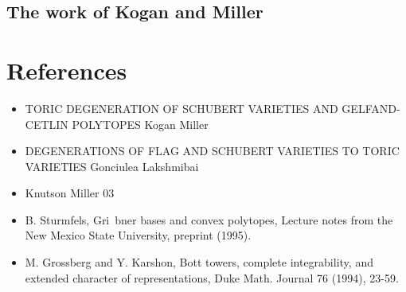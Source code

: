 \documentclass[12pt]{article}
\begin{document}
\subsection{The work of Kogan and Miller}


\section{References}
\begin{itemize}
    \item TORIC DEGENERATION OF SCHUBERT VARIETIES AND GELFAND-CETLIN POLYTOPES Kogan Miller
    \item DEGENERATIONS OF FLAG AND SCHUBERT VARIETIES TO TORIC VARIETIES Gonciulea Lakshmibai
    \item Knutson Miller 03
    \item B. Sturmfels, Gri~bner bases and convex polytopes, Lecture notes
    from the New Mexico State University, preprint (1995). 
    \item M. Grossberg and Y. Karshon, Bott towers, complete integrability,
    and extended character of representations, Duke Math. Journal 76
    (1994), 23-59. 
\end{itemize}
\end{document}

